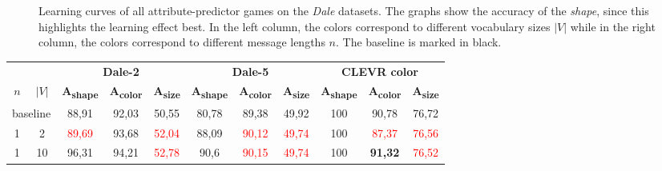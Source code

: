 \begin{figure}[ht!]
{        \label{fig:learning-curve_oh-generator_dale-5_max-len}
    }
    \caption{Learning curves of all attribute-predictor games on the \emph{Dale} datasets. The graphs show the accuracy of the \emph{shape}, since this highlights the learning effect best. In the left column, the colors correspond to different vocabulary sizes $|V|$ while in the right column, the colors correspond to different message lengths $n$. The baseline is marked in black.}
    \label{fig:learning-curves_oh-generator}
\end{figure}

\begin{table}[ht]
    \centering
    \begin{tabular}{cc|ccc|ccc|ccc}
        \toprule
                                      &         & \multicolumn{3}{c}{\textbf{Dale-2}} & \multicolumn{3}{c}{\textbf{Dale-5}} & \multicolumn{3}{c}{\textbf{CLEVR color}}                                                                                                                                                                                                           \\  \cmidrule(lr){3-5}\cmidrule(lr){6-8}\cmidrule(lr){9-11}
        $n$                           & $|V|$   & \textbf{A\textsubscript{shape}}     & \textbf{A\textsubscript{color}}     & \textbf{A\textsubscript{size}}           & \textbf{A\textsubscript{shape}} & \textbf{A\textsubscript{color}} & \textbf{A\textsubscript{size}} & \textbf{A\textsubscript{shape}} & \textbf{A\textsubscript{color}} & \textbf{A\textsubscript{size}} \\\midrule
        \multicolumn{2}{c|}{baseline} & {88,91} & {92,03}                             & {50,55}                             & {80,78}                                  & {89,38}                         & {49,92}                         & {100}                          & {90,78}                         & {76,72}                                                          \\\midrule
        {1}                           & {2}     & \textcolor{red}{89,69}              & {93,68}                             & \textcolor{red}{52,04}                   & {88,09}                         & \textcolor{red}{90,12}          & \textcolor{red}{49,74}         & {100}                           & \textcolor{red}{87,37}          & \textcolor{red}{76,56}         \\
        {1}                           & {10}    & {96,31}                             & {94,21}                             & \textcolor{red}{52,78}                   & {90,6}                          & \textcolor{red}{90,15}          & \textcolor{red}{49,74}         & {100}                           & \textbf{91,32}                  & \textcolor{red}{76,52}         \\

\end{tabular}
\end{table}
